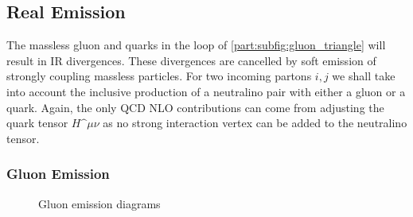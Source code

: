 \documentclass[../main.tex]{subfiles}
\begin{document}
\subsection{Real Emission}

The massless gluon and quarks in the loop of \cref{part:subfig:gluon_triangle} will result in IR divergences.
These divergences are cancelled by soft emission of strongly coupling massless particles.
For two incoming partons \(i, j\) we shall take into account the inclusive production of a neutralino pair with either a gluon or a quark.
Again, the only QCD NLO contributions can come from adjusting the quark tensor \(H\^{\mu\nu}\) as no strong interaction vertex can be added to the neutralino tensor.

\subsubsection*{Gluon Emission}
\begin{figure}[ht!]
  \centering
  \begin{subfigure}{0.49\textwidth}
    \centering
    \caption{}
    \label{part:subfig:gluon_emission_t}
  \end{subfigure}
  \begin{subfigure}{0.49\textwidth}
    \centering
    \caption{}
    \label{part:subfig:gluon_emission_u}
  \end{subfigure}
  \caption{Gluon emission diagrams}
  \label{part:fig:gluon_emission}
\end{figure}
\end{document}
